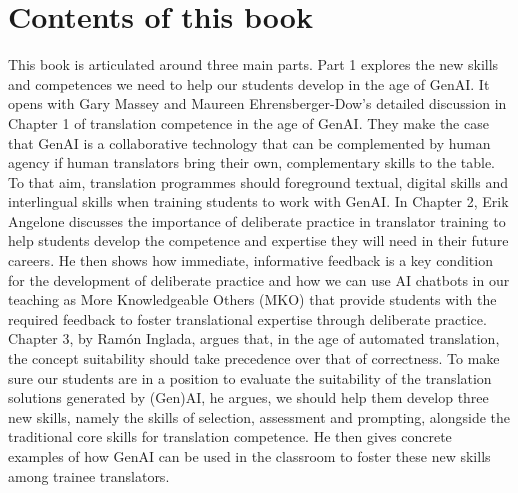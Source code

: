 \documentclass[output=paper]{langscibook}
\begin{document}
\section{Contents of this book}
This book is articulated around three main parts. Part 1 explores the new skills and competences we need to help our students develop in the age of GenAI. It opens with Gary Massey and Maureen Ehrensberger-Dow’s detailed discussion in Chapter 1 of translation competence in the age of GenAI. They make the case that GenAI is a collaborative technology that can be complemented by human agency if human translators bring their own, complementary skills to the table. To that aim, translation programmes should foreground textual, digital skills and interlingual skills when training students to work with GenAI. In Chapter 2, Erik Angelone discusses the importance of deliberate practice in translator training to help students develop the competence and expertise they will need in their future careers. He then shows how immediate, informative feedback is a key condition for the development of deliberate practice and how we can use AI chatbots in our teaching as More Knowledgeable Others (MKO) that provide students with the required feedback to foster translational expertise through deliberate practice. Chapter 3, by Ramón Inglada, argues that, in the age of automated translation, the concept suitability should take precedence over that of correctness. To make sure our students are in a position to evaluate the suitability of the translation solutions generated by (Gen)AI, he argues, we should help them develop three new skills, namely the skills of selection, assessment and prompting, alongside the traditional core skills for translation competence. He then gives concrete examples of how GenAI can be used in the classroom to foster these new skills among trainee translators.
\end{document}

